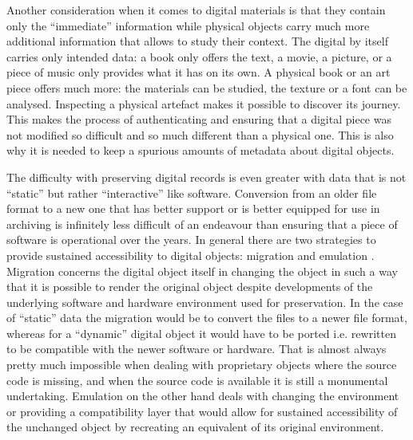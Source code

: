 Another consideration when it comes to digital materials is that they contain
only the ``immediate'' information while physical objects carry much more
additional information that allows to study their context. The digital by
itself carries only intended data: a book only offers the text, a movie,
a picture, or a piece of music only provides what it has on its own. A physical
book or an art piece offers much more: the materials can be studied, the
texture or a font can be analysed. Inspecting a physical artefact makes it
possible to discover its journey. This makes the process of authenticating and
ensuring that a digital piece was not modified so difficult and so much
different than a physical one. This is also why it is needed to keep a spurious
amounts of metadata about digital objects.

The difficulty with preserving digital records is even greater with data that
is not ``static'' but rather ``interactive'' like software. Conversion from an
older file format to a new one that has better support or is better equipped
for use in archiving is infinitely less difficult of an endeavour than
ensuring that a piece of software is operational over the years. In general
there are two strategies to provide sustained accessibility to digital
objects: migration and emulation \cite{hoeven2007}. Migration concerns the
digital object itself in changing the object in such a way that it is possible
to render the original object despite developments of the underlying software
and hardware environment used for preservation. In the case of ``static'' data
the migration would be to convert the files to a newer file format, whereas
for a ``dynamic'' digital object it would have to be ported i.e. rewritten to be
compatible with the newer software or hardware. That is almost always pretty
much impossible when dealing with proprietary objects where the source code is
missing, and when the source code is available it is still a monumental
undertaking. Emulation on the other hand deals with changing the environment
or providing a compatibility layer that would allow for sustained
accessibility of the unchanged object by recreating an equivalent of its
original environment.

